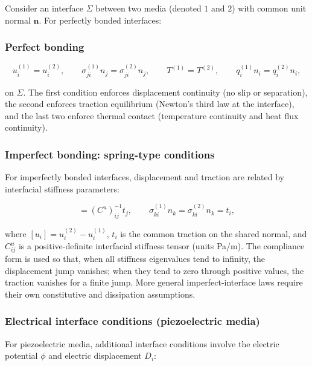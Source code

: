 Consider an interface $\Sigma$ between two media (denoted $1$ and $2$) with common unit normal $\bm{n}$. For perfectly bonded interfaces:

\subsubsection{Perfect bonding}

\begin{equation}
u_i^{(1)} = u_i^{(2)},
\qquad
\sigma_{ji}^{(1)}n_j = \sigma_{ji}^{(2)}n_j,
\qquad
T^{(1)} = T^{(2)},
\qquad
q_i^{(1)}n_i = q_i^{(2)}n_i,
\label{eq:3.31}
\end{equation}

on $\Sigma$. The first condition enforces displacement continuity (no slip or separation), the second enforces traction equilibrium (Newton's third law at the interface), and the last two enforce thermal contact (temperature continuity and heat flux continuity).

\subsubsection{Imperfect bonding: spring-type conditions}

For imperfectly bonded interfaces, displacement and traction are related by interfacial stiffness parameters:

\begin{equation}
[u_i] = (C^u)^{-1}_{ij} t_j,
\qquad
\sigma_{ki}^{(1)}n_k = \sigma_{ki}^{(2)}n_k = t_i,
\label{eq:3.32}
\end{equation}

where $[u_i]=u_i^{(2)}-u_i^{(1)}$, $t_i$ is the common traction on the shared normal, and $C^u_{ij}$ is a positive-definite interfacial stiffness tensor (units Pa/m). The compliance form is used so that, when all stiffness eigenvalues tend to infinity, the displacement jump vanishes; when they tend to zero through positive values, the traction vanishes for a finite jump. More general imperfect-interface laws require their own constitutive and dissipation assumptions.

\subsubsection{Electrical interface conditions (piezoelectric media)}

For piezoelectric media, additional interface conditions involve the electric potential $\phi$ and electric displacement $D_i$:

